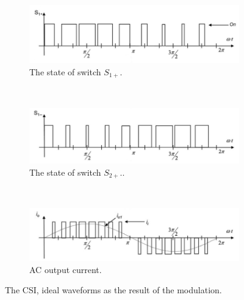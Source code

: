 \begin{figure}[h!]
                \centering
                \begin{subfigure}[b]{0.9\textwidth}
                    \includegraphics[width=\textwidth]{EMPC_PNG_Pics/CSIwaves_A.png}
                    \caption{\centering The state of switch $S_{1+}$.}
                    \label{BASICCSR:fig:CSIwave_A}
                \end{subfigure}
                ~ %
                \begin{subfigure}[b]{0.9\textwidth}
                    \includegraphics[width=\textwidth]{EMPC_PNG_Pics/CSIwaves_B.png}
                    \caption{\centering The state of switch $S_{2+}$..}
                    \label{BASICCSR:fig:CSIwave_B}
                \end{subfigure}
								 ~ %
                \begin{subfigure}[b]{0.9\textwidth}
                    \includegraphics[width=\textwidth]{EMPC_PNG_Pics/CSIwaves_C.png}
                    \caption{\centering AC output current.}
                    \label{BASICCSR:fig:CSIwave_C}
                \end{subfigure}

                \caption{The CSI, ideal waveforms as the result of the modulation.}
            \end{figure}

